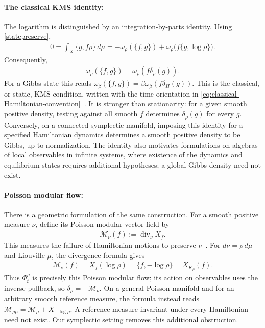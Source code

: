 \documentclass[a4paper,11pt]{article}
\theoremstyle{definition}
\begin{document}
\paragraph{The classical KMS identity:}
The logarithm is distinguished by an integration-by-parts identity. Using \eqref{statepreserve},
\begin{align}
    0=\int_X\{g,f\rho\}\,d\mu
    =-\omega_\rho(\{f,g\})+
    \omega_\rho\bigl(f\{g,\log\rho\}\bigr).
\end{align}
Consequently,
\begin{align}\label{KMSclassical}
    \omega_\rho(\{f,g\})=\omega_\rho(f\delta_\rho(g)).
\end{align}
For a Gibbs state this reads $\omega_\beta(\{f,g\})=\beta\omega_\beta(f\delta_H(g))$. This is the classical, or static, KMS condition, written with the time orientation in \eqref{eq:classical-Hamiltonian-convention}~\cite{vanDeVen2022}. It is stronger than stationarity: for a given smooth positive density, testing against all smooth $f$ determines $\delta_\rho(g)$ for every $g$. Conversely, on a connected symplectic manifold, imposing this identity for a specified Hamiltonian dynamics determines a smooth positive density to be Gibbs, up to normalization. The identity also motivates formulations on algebras of local observables in infinite systems, where existence of the dynamics and equilibrium states requires additional hypotheses; a global Gibbs density need not exist.

\paragraph{Poisson modular flow:}
There is a geometric formulation of the same construction. For a smooth positive measure $\nu$, define its Poisson modular vector field by
\begin{align}
    \mathcal M_\nu(f):=\operatorname{div}_\nu X_f.
\end{align}
This measures the failure of Hamiltonian motions to preserve $\nu$~\cite{Weinstein1997}. For $d\nu=\rho\,d\mu$ and Liouville $\mu$, the divergence formula gives
\begin{align}
    \mathcal M_\nu(f)=X_f(\log\rho)
    =\{f,-\log\rho\}=X_{K_\rho}(f).
\end{align}
Thus $\Phi_t^\rho$ is precisely this Poisson modular flow; its action on observables uses the inverse pullback, so $\delta_\rho=-\mathcal M_\nu$. On a general Poisson manifold and for an arbitrary smooth reference measure, the formula instead reads $\mathcal M_{\rho\mu}=\mathcal M_\mu+X_{-\log\rho}$. A reference measure invariant under every Hamiltonian need not exist. Our symplectic setting removes this additional obstruction.
\end{document}
